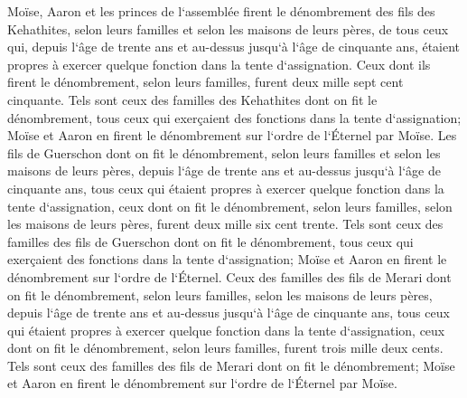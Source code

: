 \verse Moïse, Aaron et les princes de l`assemblée firent le dénombrement des fils des Kehathites, selon leurs familles et selon les maisons de leurs pères, 
\verse de tous ceux qui, depuis l`âge de trente ans et au-dessus jusqu`à l`âge de cinquante ans, étaient propres à exercer quelque fonction dans la tente d`assignation. 
\verse Ceux dont ils firent le dénombrement, selon leurs familles, furent deux mille sept cent cinquante. 
\verse Tels sont ceux des familles des Kehathites dont on fit le dénombrement, tous ceux qui exerçaient des fonctions dans la tente d`assignation; Moïse et Aaron en firent le dénombrement sur l`ordre de l`Éternel par Moïse. 
\verse Les fils de Guerschon dont on fit le dénombrement, selon leurs familles et selon les maisons de leurs pères, 
\verse depuis l`âge de trente ans et au-dessus jusqu`à l`âge de cinquante ans, tous ceux qui étaient propres à exercer quelque fonction dans la tente d`assignation, 
\verse ceux dont on fit le dénombrement, selon leurs familles, selon les maisons de leurs pères, furent deux mille six cent trente. 
\verse Tels sont ceux des familles des fils de Guerschon dont on fit le dénombrement, tous ceux qui exerçaient des fonctions dans la tente d`assignation; Moïse et Aaron en firent le dénombrement sur l`ordre de l`Éternel. 
\verse Ceux des familles des fils de Merari dont on fit le dénombrement, selon leurs familles, selon les maisons de leurs pères, 
\verse depuis l`âge de trente ans et au-dessus jusqu`à l`âge de cinquante ans, tous ceux qui étaient propres à exercer quelque fonction dans la tente d`assignation, 
\verse ceux dont on fit le dénombrement, selon leurs familles, furent trois mille deux cents. 
\verse Tels sont ceux des familles des fils de Merari dont on fit le dénombrement; Moïse et Aaron en firent le dénombrement sur l`ordre de l`Éternel par Moïse. 
